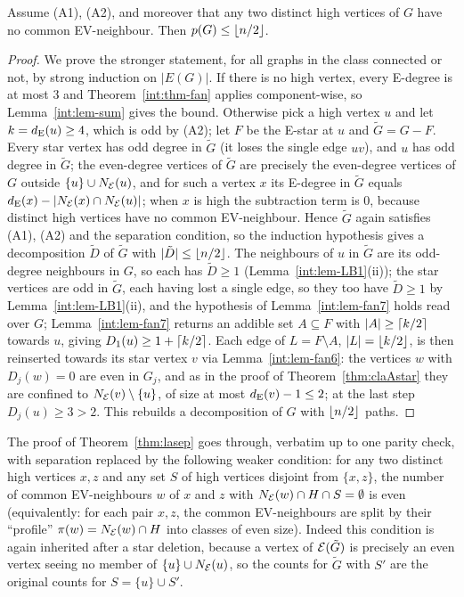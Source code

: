 \begin{theorem}\label{thm:lasep}
Assume {\rm(A1)}, {\rm(A2)}, and moreover that any two distinct high
vertices of $G$ have no common EV-neighbour. Then $p(G)\le\left\lfloor n/2 \right\rfloor$.
\end{theorem}
\begin{proof}
We prove the stronger statement, for all graphs in the class connected or
not, by strong induction on $|E(G)|$. If there is no high vertex, every
E-degree is at most $3$ and Theorem~\ref{int:thm-fan} applies component-wise,
so Lemma~\ref{int:lem-sum} gives the bound. Otherwise pick a high vertex $u$
and let $k=d_{\mathrm{E}}(u)\ge 4$, which is odd by {\rm(A2)}; let $F$ be the E-star
at $u$ and $\tilde G=G-F$. Every star vertex has odd degree in $\tilde G$
(it loses the single edge $uv$), and $u$ has odd degree in $\tilde G$; the
even-degree vertices of $\tilde G$ are precisely the even-degree vertices
of $G$ outside $\{u\}\cup N_{\mathcal{E}}(u)$, and for such a vertex $x$ its
E-degree in $\tilde G$ equals
$d_{\mathrm{E}}(x)-|N_{\mathcal{E}}(x)\cap N_{\mathcal{E}}(u)|$; when $x$ is high the subtraction
term is $0$, because distinct high vertices have no common EV-neighbour.
Hence $\tilde G$ again satisfies {\rm(A1)}, {\rm(A2)} and the separation
condition, so the induction hypothesis gives a decomposition $\tilde D$ of
$\tilde G$ with $|\tilde D|\le\left\lfloor n/2 \right\rfloor$. The neighbours of $u$ in
$\tilde G$ are its odd-degree neighbours in $G$, so each has
$\tilde D\ge 1$ (Lemma~\ref{int:lem-LB1}(ii)); the star vertices are odd in
$\tilde G$, each having lost a single edge, so they too have
$\tilde D\ge1$ by Lemma~\ref{int:lem-LB1}(ii), and the hypothesis of
Lemma~\ref{int:lem-fan7} holds read over $G$; Lemma~\ref{int:lem-fan7} returns an
addible set $A\subseteq F$ with $|A|\ge\left\lceil k/2 \right\rceil$ towards $u$, giving
$D_1(u)\ge 1+\left\lceil k/2 \right\rceil$. Each edge of $L=F\setminus A$, $|L|=\left\lfloor k/2 \right\rfloor$,
is then reinserted towards its star vertex $v$ via Lemma~\ref{int:lem-fan6}:
the vertices $w$ with $D_j(w)=0$ are even in $G_j$, and as in the proof of
Theorem~\ref{thm:claAstar} they are confined to
$N_{\mathcal{E}}(v)\setminus\{u\}$, of size at most $d_{\mathrm{E}}(v)-1\le 2$; at the last
step $D_j(u)\ge 3>2$. This rebuilds a decomposition of $G$ with
$\left\lfloor n/2 \right\rfloor$ paths.
\end{proof}

\begin{remark}\label{rem:claCO}
The proof of Theorem~\ref{thm:lasep} goes through, verbatim up to one
parity check, with separation replaced by the following weaker condition:
for any two distinct high vertices $x,z$ and any set $S$ of high vertices
disjoint from $\{x,z\}$, the number of common EV-neighbours $w$ of $x$ and
$z$ with $N_{\mathcal{E}}(w)\cap H\cap S=\emptyset$ is even (equivalently: for
each pair $x,z$, the common EV-neighbours are split by their ``profile''
$\pi(w)=N_{\mathcal{E}}(w)\cap H$ into classes of even size). Indeed this
condition is again inherited after a star deletion, because a vertex of
$\mathcal{E}(\tilde G)$ is precisely an even vertex seeing no member of
$\{u\}\cup N_{\mathcal{E}}(u)$, so the counts for $\tilde G$ with $S'$ are the
original counts for $S=\{u\}\cup S'$.
\end{remark}

